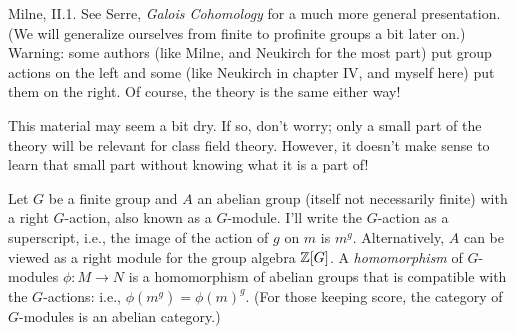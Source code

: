 %
%
%
%
%
%
%

 Milne, II.1. See Serre, \textit{Galois Cohomology} for
a much more general presentation. (We will generalize ourselves from finite
to profinite groups a bit later on.) Warning: some authors (like Milne, and
Neukirch for the most part) put
group actions on the left and some (like Neukirch in chapter IV, and myself here)
put them on the right. Of course, the theory is the same either way!

 This material may seem a bit dry. If
so, don't worry; only a small part of the theory will be relevant for
class field theory. However, it doesn't make sense to learn that small
part without knowing what it is a part of!

\medskip
Let $G$ be a finite group and $A$ an abelian group (itself not necessarily
finite) with a right $G$-action,
also known as a $G$-module. I'll write the $G$-action as a superscript,
i.e., the image of the action of $g$ on $m$ is $m^g$.
Alternatively, $A$ can be viewed as a right
module for the group algebra $\mathbb{Z}[G]$. A \emph{homomorphism} of $G$-modules
$\phi: M \to N$ is a homomorphism of abelian groups that is compatible
with the $G$-actions: i.e., $\phi(m^g) = \phi(m)^g$. (For those keeping
score, the category of $G$-modules is an abelian category.)

